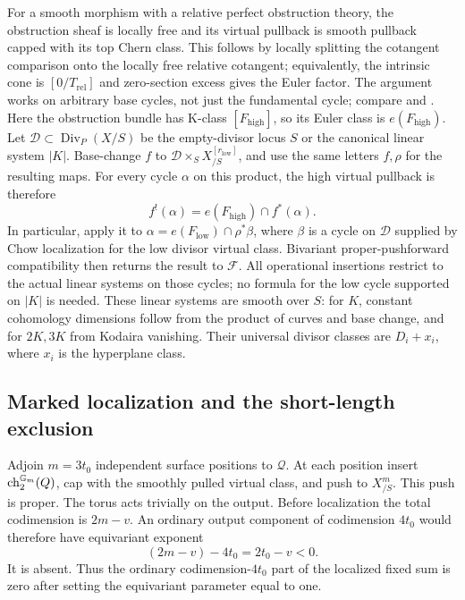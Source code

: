 For a smooth morphism with a relative perfect obstruction theory,
the obstruction sheaf is locally free and its virtual pullback is
smooth pullback capped with its top Chern class. This follows by
locally splitting the cotangent comparison onto the locally free
relative cotangent; equivalently, the intrinsic cone is
\([0/T_{\mathrm{rel}}]\) and zero-section excess gives the Euler
factor. The argument works on arbitrary base cycles, not just the
fundamental cycle; compare \cite[Proposition 7.3]{BF} and
\cite[Theorem 4.4]{Manolache}.
Here the obstruction bundle has K-class \([F_{\mathrm{high}}]\),
so its Euler class is \(e(F_{\mathrm{high}})\).  Let
\(\mathcal D\subset\operatorname{Div}_{P}(X/S)\) be the empty-divisor
locus \(S\) or the canonical linear system \(|K|\).
Base-change \(f\) to
\(\mathcal D\times_S X^{[r_{\mathrm{low}}]}_{/S}\), and use the
same letters \(f,\rho\) for the resulting maps.  For every cycle
\(\alpha\) on this product, the high virtual pullback is therefore
\begin{equation}
\label{eq:high-smooth-pullback}
 f^!(\alpha)=e(F_{\mathrm{high}})\cap f^*(\alpha).
\end{equation}
In particular, apply it to
\(\alpha=e(F_{\mathrm{low}})\cap\rho^*\beta\), where \(\beta\)
is a cycle on \(\mathcal D\) supplied by Chow localization for the
low divisor virtual class.  Bivariant proper-pushforward compatibility
then returns the result to \(\mathcal F\).  All operational
insertions restrict to the actual linear systems on those cycles;
no formula for the low cycle supported on \(|K|\) is needed.
These linear systems are smooth over \(S\): for \(K\), constant
cohomology dimensions follow from the product of curves and base
change, and for \(2K,3K\) from Kodaira vanishing.
Their universal divisor classes are \(D_i+x_i\), where \(x_i\) is
the hyperplane class.

\subsection{Marked localization and the short-length exclusion}

Adjoin \(m=3t_0\) independent surface positions to \(\mathcal Q\).
At each position insert \(\operatorname{ch}_2^{\mathbb G_m}(Q)\), cap with the
smoothly pulled virtual class, and push to \(X^m_{/S}\).
This push is proper. The torus acts trivially on the output.
Before localization the total codimension is \(2m-v\).
An ordinary output component of codimension \(4t_0\) would therefore
have equivariant exponent
\[
 (2m-v)-4t_0=2t_0-v<0.
\]
It is absent. Thus the ordinary codimension-\(4t_0\) part of the
localized fixed sum is zero after setting the equivariant parameter
equal to one.

